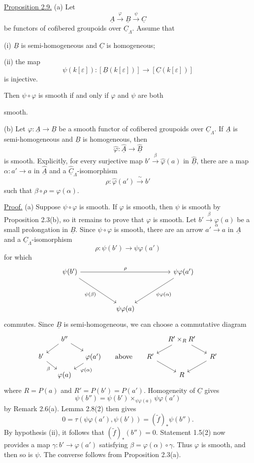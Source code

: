 \underline{Proposition 2.9.} (a) Let
\[
 \underline A\xrightarrow{\ \varphi\ }\underline B
 \xrightarrow{\ \psi\ }\underline C
\]
be functors of cofibered groupoids over $\underline C_\Lambda$.
Assume that

(i) $\underline B$ is semi-homogeneous and $\underline C$ is
homogeneous;

(ii) the map
\[
 \psi(k[\varepsilon]):[\underline B(k[\varepsilon])]
 \longrightarrow[\underline C(k[\varepsilon])]
\]
is injective.

Then $\psi\circ\varphi$ is smooth if and only if $\varphi$ and
$\psi$ are both


smooth.

(b) Let $\varphi:\underline A\longrightarrow\underline B$ be a
smooth functor of cofibered groupoids over $\underline C_\Lambda$.
If $\underline A$ is semi-homogeneous and $\underline B$ is
homogeneous, then
\[
 \widehat\varphi:\widehat{\underline A}
 \longrightarrow\widehat{\underline B}
\]
is smooth. Explicitly, for every surjective map
$b'\xrightarrow{\beta}\widehat\varphi(a)$ in
$\widehat{\underline B}$, there are a map
$\alpha:a'\longrightarrow a$ in $\widehat{\underline A}$ and a
$\widehat{\underline C}_\Lambda$-isomorphism
\[
 \rho:\widehat\varphi(a')\xrightarrow{\ \sim\ }b'
\]
such that $\beta\circ\rho=\varphi(\alpha)$.

\underline{Proof.} (a) Suppose $\psi\circ\varphi$ is smooth. If
$\varphi$ is smooth, then $\psi$ is smooth by Proposition 2.3(b),
so it remains to prove that $\varphi$ is smooth. Let
$b'\xrightarrow{\beta}\varphi(a)$ be a small prolongation in
$\underline B$. Since $\psi\circ\varphi$ is smooth, there are an
arrow $a'\xrightarrow{\alpha}a$ in $\underline A$ and a
$\underline C_\Lambda$-isomorphism
\[
 \rho:\psi(b')\longrightarrow\psi\varphi(a')
\]
for which
\[
\begin{tikzcd}[column sep=huge,row sep=huge]
 \psi(b') \arrow[rr,"{\rho}"] \arrow[dr,"{\psi(\beta)}"']
 && \psi\varphi(a') \arrow[dl,"{\psi\varphi(\alpha)}"]\\
 & \psi\varphi(a) &
\end{tikzcd}
\]
commutes. Since $\underline B$ is semi-homogeneous, we can choose a
commutative diagram
\[
\begin{tikzcd}[column sep=small,row sep=small]
 & b'' \arrow[dl] \arrow[dr] &
 &&& R'\times_RR' \arrow[dl] \arrow[dr] &\\
 b' \arrow[dr,"{\beta}"'] &&
 \varphi(a') \arrow[dl,"{\varphi(\alpha)}"]
 & \text{above} &
 R' \arrow[dr] && R' \arrow[dl]\\
 & \varphi(a) &&&& R &
\end{tikzcd}
\]
where $R=P(a)$ and $R'=P(b')=P(a')$. Homogeneity of
$\underline C$ gives
\[
 \psi(b'')=
 \psi(b')\times_{\psi\varphi(a)}\psi\varphi(a')
\]
by Remark 2.6(a). Lemma 2.8(2) then gives
\[
 0=\tau(\psi\varphi(a'),\psi(b'))
   =(\widetilde f)_*\psi(b'').
\]
By hypothesis (ii), it follows that $(\widetilde f)_*(b'')=0$.
Statement 1.5(2) now provides a map
$\gamma:b'\longrightarrow\varphi(a')$ satisfying
$\beta=\varphi(\alpha)\circ\gamma$. Thus $\varphi$ is smooth, and
then so is $\psi$. The converse follows from Proposition 2.3(a).

